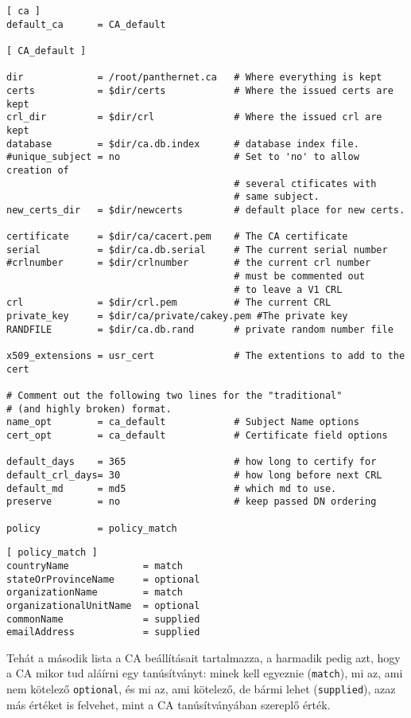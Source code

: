 \begin{Verbatim}[frame=single,label=CA beállítások]
[ ca ]
default_ca      = CA_default

[ CA_default ]

dir             = /root/panthernet.ca   # Where everything is kept
certs           = $dir/certs            # Where the issued certs are kept
crl_dir         = $dir/crl              # Where the issued crl are kept
database        = $dir/ca.db.index      # database index file.
#unique_subject = no                    # Set to 'no' to allow creation of
                                        # several ctificates with
                                        # same subject.
new_certs_dir   = $dir/newcerts         # default place for new certs.

certificate     = $dir/ca/cacert.pem    # The CA certificate
serial          = $dir/ca.db.serial     # The current serial number
#crlnumber      = $dir/crlnumber        # the current crl number
                                        # must be commented out
                                        # to leave a V1 CRL
crl             = $dir/crl.pem          # The current CRL
private_key     = $dir/ca/private/cakey.pem #The private key
RANDFILE        = $dir/ca.db.rand       # private random number file

x509_extensions = usr_cert              # The extentions to add to the cert

# Comment out the following two lines for the "traditional"
# (and highly broken) format.
name_opt        = ca_default            # Subject Name options
cert_opt        = ca_default            # Certificate field options

default_days    = 365                   # how long to certify for
default_crl_days= 30                    # how long before next CRL
default_md      = md5                   # which md to use.
preserve        = no                    # keep passed DN ordering

policy          = policy_match
\end{Verbatim}


\begin{Verbatim}[frame=single]
[ policy_match ]
countryName             = match
stateOrProvinceName     = optional
organizationName        = match
organizationalUnitName  = optional
commonName              = supplied
emailAddress            = supplied
\end{Verbatim}


Tehát a  második lista a CA beállításait tartalmazza, a harmadik pedig azt, hogy a CA mikor tud aláírni egy
tanúsítványt: minek kell egyeznie (\texttt{match}), mi az, ami nem kötelező \texttt{optional}, és mi az, ami kötelező,
de bármi lehet (\texttt{supplied}), azaz más értéket is felvehet, mint a CA tanúsítványában szereplő érték.

